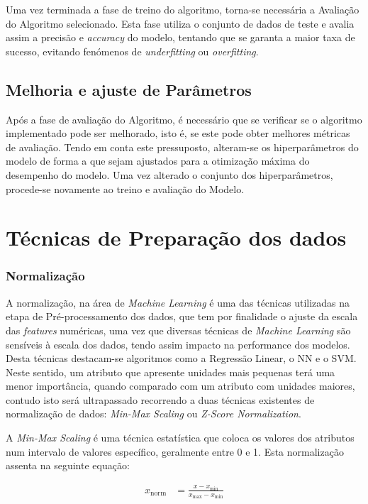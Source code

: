 \documentclass[12pt,a4paper,twoside]{report}
\begin{document}
{Uma vez terminada a fase de treino do algoritmo, torna-se necessária a Avaliação do Algoritmo selecionado. Esta fase utiliza o conjunto de dados de teste e avalia assim a precisão e \textit{accuracy} do modelo, tentando que se garanta a maior taxa de sucesso, evitando fenómenos de \textit{underfitting} ou \textit{overfitting}.

\subsection{Melhoria e ajuste de Parâmetros}

Após a fase de avaliação do Algoritmo, é necessário que se verificar se o algoritmo implementado pode ser melhorado, isto é, se este pode obter melhores métricas de avaliação. Tendo em conta este pressuposto, alteram-se os hiperparâmetros do modelo de forma a que sejam ajustados para a otimização máxima do desempenho do modelo. Uma vez alterado o conjunto dos hiperparâmetros, procede-se novamente ao treino e avaliação do Modelo.

\section{Técnicas de Preparação dos dados}

\subsubsection{Normalização}

A normalização, na área de \textit{Machine Learning} é uma das técnicas utilizadas na etapa de Pré-processamento dos dados, que tem por finalidade o ajuste da escala das \textit{features} numéricas, uma vez que diversas técnicas de \textit{Machine Learning} são sensíveis à escala dos dados, tendo assim impacto na performance dos modelos. Desta técnicas destacam-se algoritmos como a Regressão Linear, o \gls{NN} e o \gls{SVM}. Neste sentido, um atributo que apresente unidades mais pequenas terá uma menor importância, quando comparado com um atributo com unidades maiores, contudo isto será ultrapassado recorrendo a duas técnicas existentes de normalização de dados: \textit{Min-Max Scaling} ou \textit{Z-Score Normalization}.

A \textit{Min-Max Scaling} é uma técnica estatística que coloca os valores dos atributos num intervalo de valores específico, geralmente entre 0 e 1. Esta normalização assenta na seguinte equação:

\begin{align}
x_{\text{norm}} &= \frac{x - x_{\text{min}}}{x_{\text{max}} - x_{\text{min}}}\label{eq:minmax}
\end{align}

}
\end{document}
